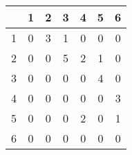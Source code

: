 \begin{tabular}{c|cccccc}
	  & 1 & 2 & 3 & 4 & 5 & 6 \\
	\hline
	1 & 0 & 3 & 1 & 0 & 0 & 0 \\
	2 & 0 & 0 & 5 & 2 & 1 & 0 \\
	3 & 0 & 0 & 0 & 0 & 4 & 0 \\
	4 & 0 & 0 & 0 & 0 & 0 & 3 \\
	5 & 0 & 0 & 0 & 2 & 0 & 1 \\
	6 & 0 & 0 & 0 & 0 & 0 & 0 \\
\end{tabular}
